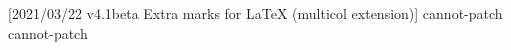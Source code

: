            [2021/03/22 v4.1beta
                  Extra marks for LaTeX (multicol extension)]
\makeatletter
\ExplSyntaxOn
\ExplSyntaxOff
\pretocmd{\return@nonemptymark}
  {
    \if@boxedmulticols\else
       {\return@nonemptymark}\fi
  }
  {}
  { {cannot-patch} {\return@nonemptymark}}
\pretocmd{\set@keptmarks}
  {
    \if@boxedmulticols\else\extramarks@get@splitmarks{\set@keptmarks}\fi
  }
  {}
  { {cannot-patch} {\set@keptmarks}}
\makeatother
\endinput

